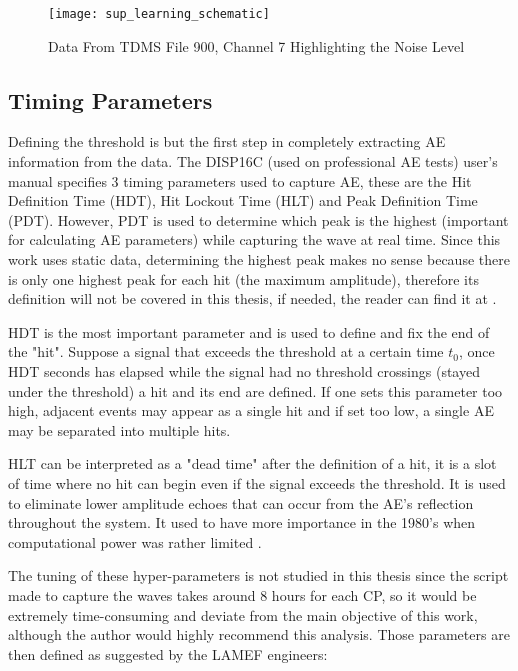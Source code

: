 \begin{figure}[H]
	\centering
	\texttt{[image: sup\_learning\_schematic]}
	\caption{Data From TDMS File 900, Channel 7 Highlighting the Noise Level}
	\label{fig:noise_example}
\end{figure}

\subsection{Timing Parameters}\label{sec:timingParameters}

Defining the threshold is but the first step in completely extracting AE information from the data. The DISP16C (used on professional AE tests) user's manual \cite{mistrasgroupDiSPAEwinUSER2011} specifies 3 timing parameters used to capture AE, these are the Hit Definition Time (HDT), Hit Lockout Time (HLT) and Peak Definition Time (PDT). However, PDT is used to determine which peak is the highest (important for calculating AE parameters) while capturing the wave at real time. Since this work uses static data, determining the highest peak makes no sense because there is only one highest peak for each hit (the maximum amplitude), therefore its definition will not be covered in this thesis, if needed, the reader can find it at \cite{mistrasgroupDiSPAEwinUSER2011}.

HDT is the most important parameter and is used to define and fix the end of the "hit". Suppose a signal that exceeds the threshold at a certain time $t_{0}$, once HDT seconds has elapsed while the signal had no threshold crossings (stayed under the threshold) a hit and its end are defined. If one sets this parameter too high, adjacent events may appear as a single hit and if set too low, a single AE may be separated into multiple hits. 


HLT can be interpreted as a "dead time" after the definition of a hit, it is a slot of time where no hit can begin even if the signal exceeds the threshold. It is used to eliminate lower amplitude echoes that can occur from the AE's reflection throughout the system. It used to have more importance in the 1980's when computational power was rather limited \cite{mistrasgroupDiSPAEwinUSER2011}.

The tuning of these hyper-parameters is not studied in this thesis since the script made to capture the waves takes around $8$ hours for each CP, so it would be extremely time-consuming and deviate from the main objective of this work, although the author would highly recommend this analysis. Those parameters are then defined as suggested by the LAMEF engineers:

